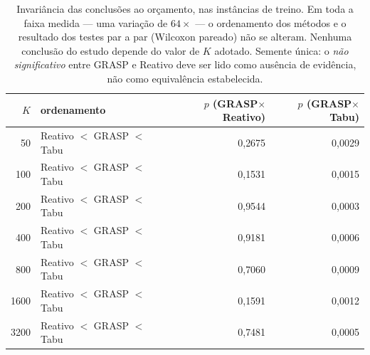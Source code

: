 \begin{table}[htbp]
\centering
\caption{Invariância das conclusões ao orçamento, nas instâncias de treino. Em toda a faixa medida --- uma variação de $64\times$ --- o ordenamento dos métodos e o resultado dos testes par a par (Wilcoxon pareado) não se alteram. Nenhuma conclusão do estudo depende do valor de $K$ adotado. Semente única: o \emph{não significativo} entre GRASP e Reativo deve ser lido como ausência de evidência, não como equivalência estabelecida.}\label{tab:invariancia}
\begin{tabular}{r l rr}
\toprule
$K$ & ordenamento & $p$ (GRASP$\times$Reativo) & $p$ (GRASP$\times$Tabu) \\
\midrule
50 & Reativo $<$ GRASP $<$ Tabu & 0{,}2675 & 0{,}0029 \\
100 & Reativo $<$ GRASP $<$ Tabu & 0{,}1531 & 0{,}0015 \\
200 & Reativo $<$ GRASP $<$ Tabu & 0{,}9544 & 0{,}0003 \\
400 & Reativo $<$ GRASP $<$ Tabu & 0{,}9181 & 0{,}0006 \\
800 & Reativo $<$ GRASP $<$ Tabu & 0{,}7060 & 0{,}0009 \\
1600 & Reativo $<$ GRASP $<$ Tabu & 0{,}1591 & 0{,}0012 \\
3200 & Reativo $<$ GRASP $<$ Tabu & 0{,}7481 & 0{,}0005 \\
\bottomrule
\end{tabular}
\end{table}
